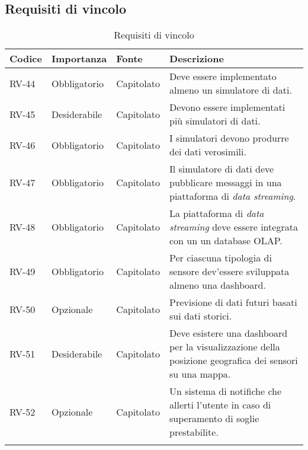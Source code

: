 \subsection{Requisiti di vincolo}
\begin{longtable}{|>{\centering\arraybackslash}m{}|>{\centering\arraybackslash}m{}|>{\centering\arraybackslash}m{}|>{\centering\arraybackslash}m{}|}
	\hline
	\textbf{Codice} & \textbf{Importanza} & \textbf{Fonte} & \textbf{Descrizione}                                                                                    \\\hline
	\endfirsthead
	\hline
	\endhead
	RV-44           & Obbligatorio        & Capitolato     & Deve essere implementato almeno un simulatore di dati.                                                  \\\hline
	RV-45           & Desiderabile        & Capitolato     & Devono essere implementati più simulatori di dati.                                                      \\\hline
	RV-46           & Obbligatorio        & Capitolato     & I simulatori devono produrre dei dati verosimili.                                                       \\\hline
	RV-47           & Obbligatorio        & Capitolato     & Il simulatore di dati deve pubblicare messaggi in una piattaforma di \textit{data streaming}.           \\\hline
	RV-48           & Obbligatorio        & Capitolato     & La piattaforma di \textit{data streaming} deve essere integrata con un un database OLAP.                \\\hline
	RV-49           & Obbligatorio        & Capitolato     & Per ciascuna tipologia di sensore dev'essere sviluppata almeno una dashboard.                           \\\hline
	RV-50           & Opzionale           & Capitolato     & Previsione di dati futuri basati sui dati storici.                                                      \\\hline
	RV-51           & Desiderabile        & Capitolato     & Deve esistere una dashboard per la visualizzazione della posizione geografica dei sensori su una mappa. \\\hline
	RV-52           & Opzionale           & Capitolato     & Un sistema di notifiche che allerti l'utente in caso di superamento di soglie prestabilite.             \\\hline
	\caption{Requisiti di vincolo}
	\label{table:3}
\end{longtable}

